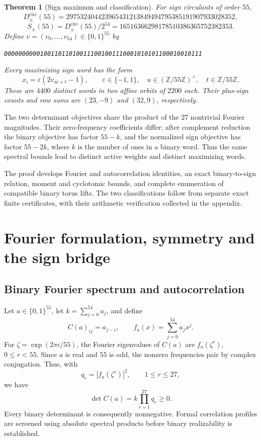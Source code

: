 \documentclass[11pt,a4paper]{article}
\newtheorem{theorem}{Theorem}
\theoremstyle{remark}
\newcommand{\Z}{\mathbb Z}
\begin{document}
\begin{theorem}[Sign maximum and classification]\label{thm:sign}
For sign circulants of order $55$,
\[
 D_{\pm}^{\mathrm{circ}}(55)=
 297532404423965431213849494795385191907933028352,
\]
\[
 S_{\pm}(55)=D_{\pm}^{\mathrm{circ}}(55)/2^{54}
 =16516366298178510386365752382353.
\]
Define $v=(v_0,\ldots,v_{54})\in\{0,1\}^{55}$ by
\begin{center}
\texttt{0000000000100110110100111001001110001010101100010010111}
\end{center}
Every maximizing sign word has the form
\[
  x_i=\varepsilon(2v_{ui+t}-1),\qquad
  \varepsilon\in\{-1,1\},\quad
  u\in(\Z/55\Z)^\times,\quad
  t\in\Z/55\Z.
\]
These are $4400$ distinct words in two affine orbits of $2200$
each.  Their plus-sign counts and row sums are $(23,-9)$ and
$(32,9)$, respectively.
\end{theorem}

The two determinant objectives share the product of the $27$
nontrivial Fourier magnitudes.  Their zero-frequency coefficients
differ: after complement reduction the binary objective has factor
$55-k$, and the normalized sign objective has factor $55-2k$,
where $k$ is the number of ones in a binary word.  Thus the
same spectral bounds lead to distinct active weights and distinct
maximizing words.

The proof develops Fourier and autocorrelation identities, an
exact binary-to-sign relation, moment and cyclotomic bounds, and
complete enumeration of compatible binary torus lifts.
The two classifications follow from separate exact finite
certificates, with their arithmetic verification collected in the
appendix.

\section{Fourier formulation, symmetry and the sign bridge}

\subsection{Binary Fourier spectrum and autocorrelation}


Let $a\in\{0,1\}^{55}$, let $k=\sum_{j=0}^{54}a_j$, and define
\[
  C(a)_{ij}=a_{j-i},
  \qquad
  f_a(x)=\sum_{j=0}^{54}a_jx^j.
\]
For $\zeta=\exp(2\pi i/55)$, the Fourier eigenvalues of
$C(a)$ are $f_a(\zeta^r)$, $0\leq r<55$.  Since $a$ is real and $55$ is odd, the nonzero frequencies
pair by complex conjugation.  Thus, with
\[
  q_r=|f_a(\zeta^r)|^2,\qquad 1\leq r\leq27,
\]
we have
\begin{equation}
\label{eq:fourier-det}
  \det C(a)=k\prod_{r=1}^{27}q_r\geq0.
\end{equation}
Every binary determinant is consequently nonnegative.  Formal
correlation profiles are screened using absolute spectral products
before binary realizability is established.
\end{document}
